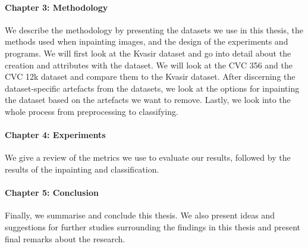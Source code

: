 \paragraph{Chapter 3: Methodology }
We describe the methodology by presenting the datasets we use in this thesis, the methods used when inpainting images, and the design of the experiments and programs. 
We will first look at the Kvasir dataset and go into detail about the creation and attributes with the dataset. We will look at the CVC 356 and the CVC 12k dataset and compare them to the Kvasir dataset.
After discerning the dataset-specific artefacts from the datasets, we look at the options for inpainting the dataset based on the artefacts we want to remove. 
Lastly, we look into the whole process from preprocessing to classifying.


\paragraph{Chapter 4: Experiments}
We give a review of the metrics we use to evaluate our results, followed by the results of the inpainting and classification.


\paragraph{Chapter 5: Conclusion}
 Finally, we summarise and conclude this thesis.
We also present ideas and suggestions for further studies surrounding
the findings in this thesis and present final remarks about the research.

